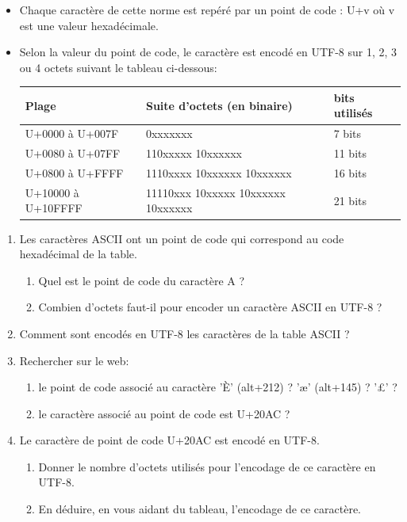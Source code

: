 \documentclass[11pt,a4paper]{article}
\newcounter{num}
\begin{document}
\begin{itemize}
\item Chaque caractère de cette norme est repéré par un point de code : \textsf{U+v} où v est une valeur hexadécimale.
\item Selon la valeur du point de code, le caractère est encodé en UTF-8 sur 1, 2, 3 ou 4 octets suivant le tableau ci-dessous:

\begin{center}
\begin{tabular}{|C{4cm}|C{8cm}|C{4cm}|}\hline
\textbf{Plage} & \textbf{Suite d'octets (en binaire)} & \textbf{bits utilisés}\\\hline
U+0000 à U+007F & 0xxxxxxx & 7 bits\\
U+0080 à U+07FF & 110xxxxx 10xxxxxx & 11 bits\\
U+0800 à U+FFFF & 1110xxxx 10xxxxxx 10xxxxxx & 16 bits\\
U+10000 à U+10FFFF & 11110xxx 10xxxxx 10xxxxxx 10xxxxxx & 21
bits\\\hline
\end{tabular}
\end{center}
\end{itemize} 

\begin{enumerate}
\item Les caractères ASCII ont un point de code qui correspond au code hexadécimal de la table. 

\begin{enumerate}

\item Quel est le point de code du caractère A ? 

\item Combien d'octets faut-il pour encoder un caractère ASCII en UTF-8 ?
\end{enumerate}

\item Comment sont encodés en UTF-8 les caractères de la table ASCII ?
\item Rechercher sur le web:
\begin{enumerate}
\item le point de code associé au caractère 'È' (alt+212) ? 'æ' (alt+145) ? '\pounds' ?
\item le caractère associé au point de code est U+20AC ?
\end{enumerate}
 
\item Le caractère de point de code \textsf{U+20AC} est encodé en UTF-8.

\begin{enumerate}

\item Donner le nombre d'octets utilisés pour l'encodage de ce caractère en UTF-8.

\item En déduire, en vous aidant du tableau, l'encodage de ce caractère.
\end{enumerate} 

\end{enumerate}
\end{document}
